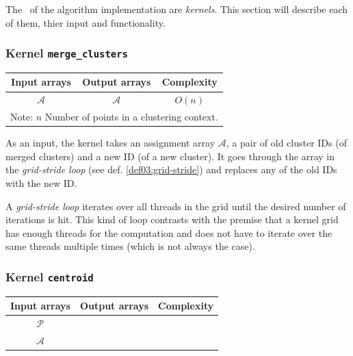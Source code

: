 The \ of the algorithm implementation are \emph{kernels}. This section will describe each of them, thier input and functionality.

\subsubsection{Kernel \texttt{merge\_clusters}}

\begin{table}[h]
	\centering
	\begin{tabular}{ccc}
		\toprule
		\textbf{Input arrays} & \textbf{Output arrays} & \textbf{Complexity} \\ \midrule
		    $\mathcal{A}$     &     $\mathcal{A}$      &       $O(n)$        \\ \bottomrule
		    \multicolumn{3}{l}{\footnotesize Note: $n$ Number of points in a clustering context.}
	\end{tabular}
\end{table}

As an input, the kernel takes an assignment array $\mathcal{A}$, a pair of old cluster IDs (of merged clusters) and a new ID (of a new cluster). It goes through the array in the \emph{grid-stride loop} (see def. \ref{def03:grid-stride}) and replaces any of the old IDs with the new ID.

\begin{defn}
	A \emph{grid-stride loop} iterates over all threads in the grid until the desired number of iterations is hit. This kind of loop contrasts with the premise that a kernel grid has enough threads for the computation and does not have to iterate over the same threads multiple times (which is not always the case). 
	\label{def03:grid-stride}
\end{defn}

\subsubsection{Kernel \texttt{centroid}}

\begin{table}[h]
	\centering
	\begin{tabular}{ccc}
		\toprule
		\textbf{Input arrays} & \textbf{Output arrays} & \textbf{Complexity} \\ \midrule
		    $\mathcal{P}$     &                        &                     \\
		    $\mathcal{A}$     & \pulrad{$\mathcal{C}$} &   \pulrad{$O(n)$}   \\ \bottomrule 
	\end{tabular}
\end{table}

